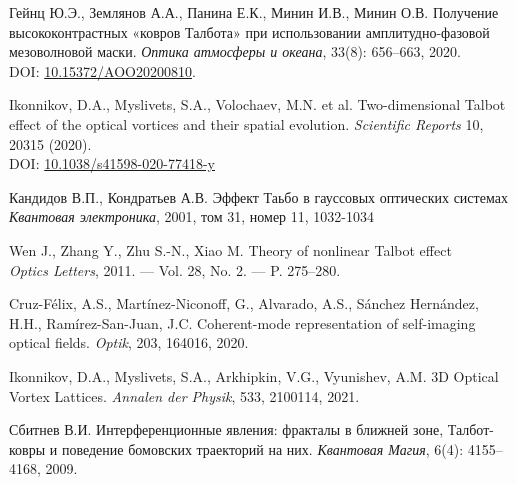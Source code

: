 \begin{thebibliography}{99}

Гейнц Ю.Э., Землянов А.А., Панина Е.К., Минин И.В., Минин О.В.
\newblock Получение высококонтрастных «ковров Талбота» при использовании амплитудно-фазовой мезоволновой маски.
\newblock \emph{Оптика атмосферы и океана}, 33(8): 656--663, 2020.\\
\newblock DOI: \href{https://doi.org/10.15372/AOO20200810}{10.15372/AOO20200810}.

Ikonnikov, D.A., Myslivets, S.A., Volochaev, M.N. et al.
\newblock Two-dimensional Talbot effect of the optical vortices and their spatial evolution. 
\newblock \emph{Scientific Reports} 10, 20315 (2020).\\
\newblock DOI: \href{https://doi.org/10.1038/s41598-020-77418-y}{10.1038/s41598-020-77418-y}

\bibitem{}
Кандидов В.П., Кондратьев А.В.
\newblock Эффект Таьбо в гауссовых оптических системах\\
\newblock \emph{Квантовая электроника}, 2001, том 31, номер 11, 1032-1034

Wen J., Zhang Y., Zhu S.-N., Xiao M.
\newblock Theory of nonlinear Talbot effect\\
\newblock \emph{Optics Letters}, 2011. — Vol. 28, No. 2. — P. 275--280.

Cruz-Félix, A.S., Martínez-Niconoff, G., Alvarado, A.S., Sánchez Hernández, H.H., Ramírez-San-Juan, J.C.
\newblock Coherent-mode representation of self-imaging optical fields.
\newblock \emph{Optik}, 203, 164016, 2020.

Ikonnikov, D.A., Myslivets, S.A., Arkhipkin, V.G., Vyunishev, A.M.
\newblock 3D Optical Vortex Lattices.
\newblock \emph{Annalen der Physik}, 533, 2100114, 2021.


Сбитнев В.И.
\newblock Интерференционные явления: фракталы в ближней зоне, Талбот-ковры и поведение бомовских траекторий на них.
\newblock \emph{Квантовая Магия}, 6(4): 4155--4168, 2009.


\end{thebibliography}
